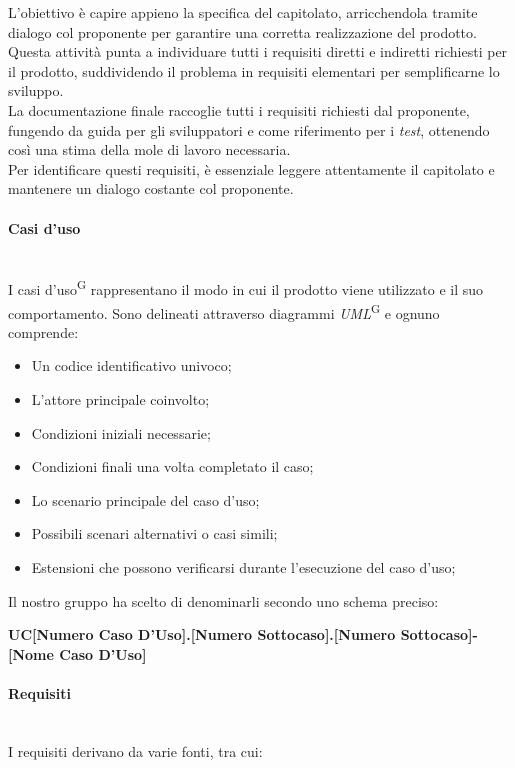 \documentclass[5pt]{article}
\begin{document}
L'obiettivo è capire appieno la specifica del capitolato, arricchendola tramite dialogo col proponente per garantire una corretta realizzazione del prodotto.\\

Questa attività punta a individuare tutti i requisiti diretti e indiretti richiesti per il prodotto, suddividendo il problema in requisiti elementari per semplificarne lo sviluppo.\\

La documentazione finale raccoglie tutti i requisiti richiesti dal proponente, fungendo da guida per gli sviluppatori e come riferimento per i \textit{test}, ottenendo così una stima della mole di lavoro necessaria.\\

Per identificare questi requisiti, è essenziale leggere attentamente il capitolato e mantenere un dialogo costante col proponente.

\paragraph{Casi d'uso}~\\
I casi d'uso\textsuperscript{G} rappresentano il modo in cui il prodotto viene utilizzato e il suo comportamento. Sono delineati attraverso diagrammi \textit{UML}\textsuperscript{G} e ognuno comprende:

\begin{itemize}
    \item Un codice identificativo univoco;
    \item L'attore principale coinvolto;
    \item Condizioni iniziali necessarie;
    \item Condizioni finali una volta completato il caso;
    \item Lo scenario principale del caso d'uso;
    \item Possibili scenari alternativi o casi simili;
    \item Estensioni che possono verificarsi durante l'esecuzione del caso d'uso;
\end{itemize}

Il nostro gruppo ha scelto di denominarli secondo uno schema preciso: 

\begin{center}
    \textbf{UC[Numero Caso D'Uso].[Numero Sottocaso].[Numero Sottocaso]-[Nome Caso D'Uso]}
\end{center}

\paragraph{Requisiti}~\\
I requisiti derivano da varie fonti, tra cui:
\end{document}
